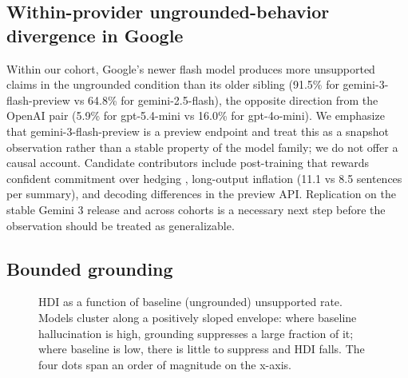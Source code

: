 \documentclass[11pt]{article}
\begin{document}
\subsection{Within-provider ungrounded-behavior divergence in Google}

Within our cohort, Google's newer flash model produces more unsupported claims in the ungrounded condition than its older sibling (91.5\% for gemini-3-flash-preview vs 64.8\% for gemini-2.5-flash), the opposite direction from the OpenAI pair (5.9\% for gpt-5.4-mini vs 16.0\% for gpt-4o-mini). We emphasize that gemini-3-flash-preview is a preview endpoint and treat this as a snapshot observation rather than a stable property of the model family; we do not offer a causal account. Candidate contributors include post-training that rewards confident commitment over hedging \citep{ouyang2022training}, long-output inflation (11.1 vs 8.5 sentences per summary), and decoding differences in the preview API. Replication on the stable Gemini 3 release and across cohorts is a necessary next step before the observation should be treated as generalizable.

\subsection{Bounded grounding}

\begin{figure}[!t]
\centering
{}
\caption{HDI as a function of baseline (ungrounded) unsupported rate. Models cluster along a positively sloped envelope: where baseline hallucination is high, grounding suppresses a large fraction of it; where baseline is low, there is little to suppress and HDI falls. The four dots span an order of magnitude on the x-axis.}
\label{fig:hdi-scatter}
\end{figure}
\end{document}
